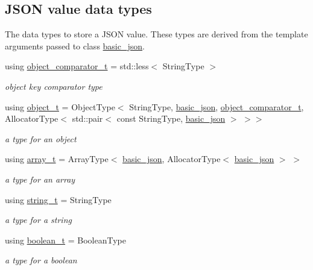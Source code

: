 \subsection*{J\+S\+ON value data types}
\label{_amgrpbddfba6d49869d59bfd397e65b8cba87}%
The data types to store a J\+S\+ON value. These types are derived from the template arguments passed to class \hyperlink{classnlohmann_1_1basic__json}{basic\+\_\+json}. \begin{DoxyCompactItemize}
\item 
using \hyperlink{classnlohmann_1_1basic__json_ac26c2e8d6bcaccde372ceedd81851200}{object\+\_\+comparator\+\_\+t} = std\+::less$<$ String\+Type $>$
\begin{DoxyCompactList}\small\item\em object key comparator type \end{DoxyCompactList}\item 
using \hyperlink{classnlohmann_1_1basic__json_aef3ff5a73597850597d1d40db9edd376}{object\+\_\+t} = Object\+Type$<$ String\+Type, \hyperlink{classnlohmann_1_1basic__json}{basic\+\_\+json}, \hyperlink{classnlohmann_1_1basic__json_ac26c2e8d6bcaccde372ceedd81851200}{object\+\_\+comparator\+\_\+t}, Allocator\+Type$<$ std\+::pair$<$ const String\+Type, \hyperlink{classnlohmann_1_1basic__json}{basic\+\_\+json} $>$ $>$$>$
\begin{DoxyCompactList}\small\item\em a type for an object \end{DoxyCompactList}\item 
using \hyperlink{classnlohmann_1_1basic__json_a858c1cf8407bc06494e3a1114a3b73e7}{array\+\_\+t} = Array\+Type$<$ \hyperlink{classnlohmann_1_1basic__json}{basic\+\_\+json}, Allocator\+Type$<$ \hyperlink{classnlohmann_1_1basic__json}{basic\+\_\+json} $>$ $>$
\begin{DoxyCompactList}\small\item\em a type for an array \end{DoxyCompactList}\item 
using \hyperlink{classnlohmann_1_1basic__json_a33593865ffb1860323dcbd52425b90c8}{string\+\_\+t} = String\+Type
\begin{DoxyCompactList}\small\item\em a type for a string \end{DoxyCompactList}\item 
using \hyperlink{classnlohmann_1_1basic__json_a44fd1a12c9c54623c942b430e7a72937}{boolean\+\_\+t} = Boolean\+Type
\begin{DoxyCompactList}\small\item\em a type for a boolean \end{DoxyCompactList}\item 
$$
\end{DoxyCompactItemize}
